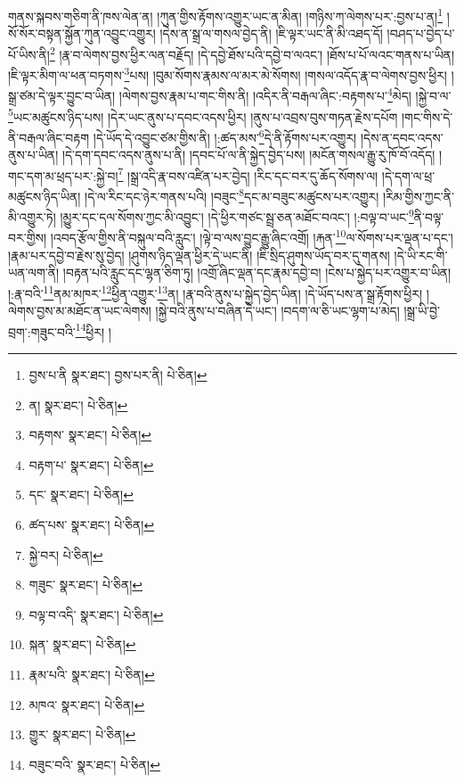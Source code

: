 གནས་སྐབས་གཅིག་ནི་ཁས་ལེན་ན། །ཀུན་གྱིས་རྟོགས་འགྱུར་ཡང་ན་མིན། །གཉིས་ཀ་ལེགས་པར་:བྱས་པ་ན།\footnote{བྱས་པ་ནི  སྣར་ཐང་། བྱས་པར་ནི།  པེ་ཅིན། } །སོ་སོར་བསྟན་སྐྱོན་ཀུན་འབྱུང་འགྱུར། །དེས་ན་སྒྲ་ལ་གསལ་བྱེད་ནི། །ཇི་ལྟར་ཡང་ནི་མི་འཐད་དོ། །བཤད་པ་བྱེད་པ་པོ་ཡིས་ནི།\footnote{ན།  སྣར་ཐང་།  པེ་ཅིན། } །རྣ་བ་ལེགས་བྱས་ཕྱིར་ལན་བརྗོད། །དེ་དབྱེ་ཐོས་པའི་དབྱེ་བ་ལའང་། །ཐོས་པ་པོ་ལའང་གནས་པ་ཡིན། །ཇི་ལྟར་མིག་ལ་ཕན་བཏགས་\footnote{བརྟགས་  སྣར་ཐང་།  པེ་ཅིན། }པས། །བུམ་སོགས་རྣམས་ལ་མར་མེ་སོགས། །གསལ་འདོད་རྣ་བ་ལེགས་བྱས་ཕྱིར། །སྒྲ་ཙམ་དེ་ལྟར་བྱུང་བ་ཡིན། །ལེགས་བྱས་རྣམ་པ་གང་གིས་ནི། །འདིར་ནི་བརྒལ་ཞིང་:བརྟགས་པ་\footnote{བརྟག་པ་  སྣར་ཐང་།  པེ་ཅིན། }མེད། །སྐྱེ་བ་ལ་\footnote{དང་  སྣར་ཐང་།  པེ་ཅིན། }ཡང་མཚུངས་ཉིད་པས། །དེར་ཡང་ནུས་པ་དབང་འདས་ཕྱིར། །ནུས་པ་འབྲས་བུས་གཏན་རྗེས་དཔོག །གང་གིས་དེ་ནི་བརྒལ་ཞིང་བརྟག །དེ་ཡོད་དེ་འབྱུང་ཙམ་གྱིས་ནི། །:ཚད་མས་\footnote{ཚད་པས་  སྣར་ཐང་།  པེ་ཅིན། }དེ་ནི་རྟོགས་པར་འགྱུར། །དེས་ན་དབང་འདས་ནུས་པ་ཡིན། །དེ་དག་དབང་འདས་ནུས་པ་ནི། །དབང་པོ་ལ་ནི་སྐྱེད་བྱེད་པས། །མངོན་གསལ་རྒྱུ་རུ་ཁོ་བོ་འདོད། །གང་དག་མ་ཕྲད་པར་:སྐྱེ་བ།\footnote{སྐྱེ་བར།  པེ་ཅིན། } །སྒྲ་འདི་རྣ་བས་འཛིན་པར་བྱེད། །རིང་དང་བར་དུ་ཆོད་སོགས་ལ། །དེ་དག་ལ་ཕྲ་མཚུངས་ཉིད་ཡིན། །དེ་ལ་རིང་དང་ཉེར་གནས་པའི། །བཟུང་\footnote{གཟུང་  སྣར་ཐང་།  པེ་ཅིན། }དང་མ་བཟུང་མཚུངས་པར་འགྱུར། །རིམ་གྱིས་ཀྱང་ནི་མི་འགྱུར་ཏེ། །མྱུར་དང་དལ་སོགས་ཀྱང་མི་འབྱུང་། །དེ་ཕྱིར་གཙང་སྦྲ་ཅན་མཐོང་བའང་། །:བལྟ་བ་ཡང་\footnote{བལྟ་བ་འདི་  སྣར་ཐང་།  པེ་ཅིན། }ནི་བལྟ་བར་གྱིས། །འབད་རྩོལ་གྱིས་ནི་བསྐུལ་བའི་རླུང་། །ལྟེ་བ་ལས་བྱུང་རྒྱུ་ཞིང་འགྲོ། །རྐན་\footnote{སྐན་  སྣར་ཐང་།  པེ་ཅིན། }ལ་སོགས་པར་ལྡན་པ་དང་། །རྣམ་པར་དབྱེ་བ་རྗེས་སུ་བྱེད། །ཤུགས་ཉིད་ལྡན་ཕྱིར་དེ་ཡང་ནི། །ཇི་སྲིད་ཤུགས་ཡོད་བར་དུ་གནས། །དེ་ཡི་རང་གི་ཡན་ལག་ནི། །བརྟན་པའི་རླུང་དང་ལྷན་ཅིག་ཏུ། །འགྲོ་ཞིང་ལྡན་དང་རྣམ་དབྱེ་བ། །ངེས་པ་སྐྱེད་པར་འགྱུར་བ་ཡིན། །:རྣ་བའི་\footnote{རྣམ་པའི་  སྣར་ཐང་།  པེ་ཅིན། }ནམ་མཁར་\footnote{མཁའ་  སྣར་ཐང་།  པེ་ཅིན། }ཕྱིན་འགྱུར་\footnote{གྱུར་  སྣར་ཐང་།  པེ་ཅིན། }ན། །རྣ་བའི་ནུས་པ་སྐྱེད་བྱེད་ཡིན། །དེ་ཡོད་པས་ན་སྒྲ་རྟོགས་ཕྱིར། །ལེགས་བྱས་མ་མཐོང་ན་ཡང་ལེགས། །སྐྱེ་བའི་ནུས་པ་བཞིན་དེ་ཡང་། །བདག་ལ་ཅི་ཡང་ལྷག་པ་མེད། །སྒྲ་ཡི་བྱེ་བྲག་:གཟུང་བའི་\footnote{བཟུང་བའི་  སྣར་ཐང་།  པེ་ཅིན། }ཕྱིར། །
